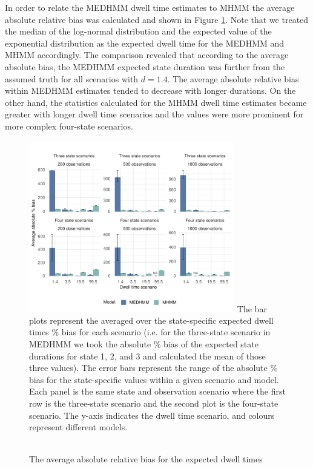 In order to relate the MEDHMM dwell time estimates to MHMM the average absolute relative bias was calculated and shown in Figure \ref{exp_dwell_bias}. Note that we treated the median of the log-normal distribution and the expected value of the exponential distribution as the expected dwell time for the MEDHMM and MHMM accordingly. The comparison revealed that according to the average absolute bias, the MEDHMM expected state duration was further from the assumed truth for all scenarios with $d=1.4$. The average absolute relative bias within MEDHMM estimates tended to decrease with longer durations. On the other hand, the statistics calculated for the MHMM dwell time estimates became greater with longer dwell time scenarios and the values were more prominent for more complex four-state scenarios. 
\begin{figure}[h]
\caption{\\The average absolute relative bias for the expected dwell times } 
    \centering
    \includegraphics[width=0.8\textwidth]{graphics/expected_dwell_biasv2.pdf}
\flushleft
\footnotesize
\justifying
The bar plots represent the averaged over the state-specific expected dwell times \% bias for each scenario (i.e. for the three-state scenario in MEDHMM we took the absolute \% bias of the expected state durations for state 1, 2, and 3 and calculated the mean of those three values). The error bars represent the range of the absolute \% bias for the state-specific values within a given scenario and model. Each panel is the same state and observation scenario where the first row is the three-state scenario and the second plot is the four-state scenario. The y-axis indicates the dwell time scenario, and colours represent different models. 
\label{exp_dwell_bias}
\end{figure}

